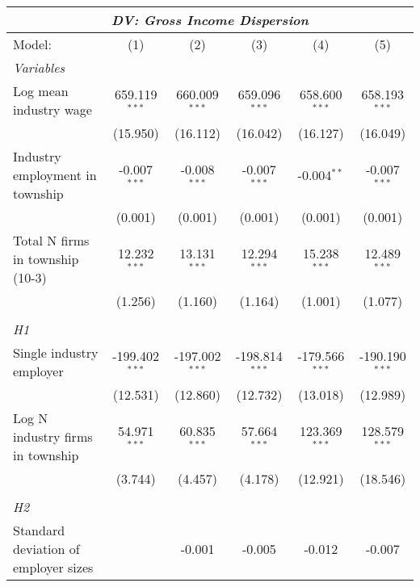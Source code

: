 \begingroup
\centering
\begin{tabular}{lccccc}
   \tabularnewline \multicolumn{6}{c}{\textit{DV: Gross Income Dispersion}} \\ \midrule \midrule
   Model:                               & (1)              & (2)              & (3)              & (4)              & (5)\\  
   \midrule
   \emph{Variables}\\
   Log mean industry wage               & 659.119$^{***}$  & 660.009$^{***}$  & 659.096$^{***}$  & 658.600$^{***}$  & 658.193$^{***}$\\   
                                        & (15.950)         & (16.112)         & (16.042)         & (16.127)         & (16.049)\\   
   Industry employment in township      & -0.007$^{***}$   & -0.008$^{***}$   & -0.007$^{***}$   & -0.004$^{**}$    & -0.007$^{***}$\\   
                                        & (0.001)          & (0.001)          & (0.001)          & (0.001)          & (0.001)\\   
   Total N firms in township (10-3)     & 12.232$^{***}$   & 13.131$^{***}$   & 12.294$^{***}$   & 15.238$^{***}$   & 12.489$^{***}$\\   
                                        & (1.256)          & (1.160)          & (1.164)          & (1.001)          & (1.077)\\   
\hdashline %
\\[0.1ex] %
\emph{H1} \\ 
   Single industry employer             & -199.402$^{***}$ & -197.002$^{***}$ & -198.814$^{***}$ & -179.566$^{***}$ & -190.190$^{***}$\\   
                                        & (12.531)         & (12.860)         & (12.732)         & (13.018)         & (12.989)\\   
   Log N industry firms in township     & 54.971$^{***}$   & 60.835$^{***}$   & 57.664$^{***}$   & 123.369$^{***}$  & 128.579$^{***}$\\   
                                        & (3.744)          & (4.457)          & (4.178)          & (12.921)         & (18.546)\\   
\hdashline %
\\[0.1ex] %
\emph{H2} \\ 
   Standard deviation of employer sizes &                  & -0.001           & -0.005           & -0.012           & -0.007\\   

\end{tabular}
